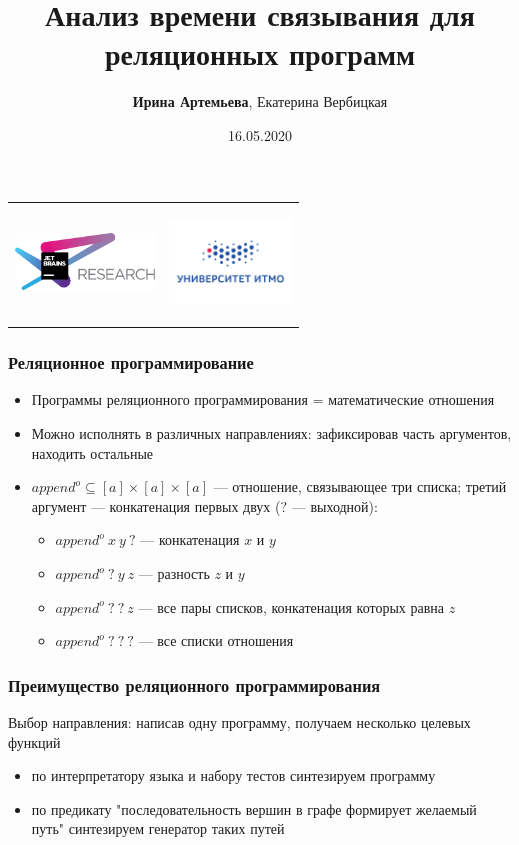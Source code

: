 \documentclass{beamer}
\title[Анализ времени связывания]{Анализ времени связывания для реляционных программ}
\institute[JetBrains Research]{
JetBrains Research, Университет ИТМО
}
\author[Артемьева И., Вербицкая Е.]{\textbf{Ирина Артемьева}, Екатерина Вербицкая}
\date{16.05.2020}
\begin{document}
{
\begin{frame}[fragile]
  \begin{tabular}{p{4.5cm} p{7cm}}
   \begin{center}
      \includegraphics[height=1.5cm]{pictures/jetbrainsResearch.pdf}
    \end{center}
    &
    \begin{center}
      \includegraphics[height=2.3cm]{pictures/itmo.png}
    \end{center}
  \end{tabular}
  \titlepage
\end{frame}
}

\begin{frame}\frametitle{Реляционное программирование}
\begin{itemize}
    \item Программы реляционного программирования = математические отношения
    \item Можно исполнять в различных направлениях: зафиксировав часть аргументов, находить остальные
    \item $append^o \subseteq [a] \times [a] \times [a]$ --- отношение, связывающее три списка; третий аргумент --- конкатенация первых двух ($?$ --- выходной):
        \begin{itemize}
            \item $append^o \ x \ y \ ?$ --- конкатенация $x$ и $y$
            \item $append^o \ ? \ y \ z$ --- разность $z$ и $y$
            \item $append^o \ ? \ ? \ z$ --- все пары списков, конкатенация которых равна $z$
            \item $append^o \ ? \ ? \ ?$ --- все списки отношения
        \end{itemize}
\end{itemize}
\end{frame}

\begin{frame}\frametitle{Преимущество реляционного программирования}
Выбор направления: написав одну программу, получаем несколько целевых функций
    \begin{itemize}
        \item по интерпретатору языка и набору тестов синтезируем программу
        \item по предикату "последовательность вершин в графе формирует желаемый путь" синтезируем генератор таких путей
    \end{itemize}
\end{frame}
\end{document}
